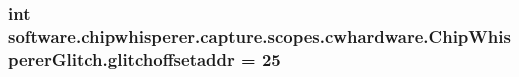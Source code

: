 \subsubsection[{glitchoffsetaddr}]{\setlength{\rightskip}{0pt plus 5cm}int software.\+chipwhisperer.\+capture.\+scopes.\+cwhardware.\+Chip\+Whisperer\+Glitch.\+glitchoffsetaddr = 25}\label{namespacesoftware_1_1chipwhisperer_1_1capture_1_1scopes_1_1cwhardware_1_1ChipWhispererGlitch_a4152d20f6b1e47093e5a66552b11d09c}
